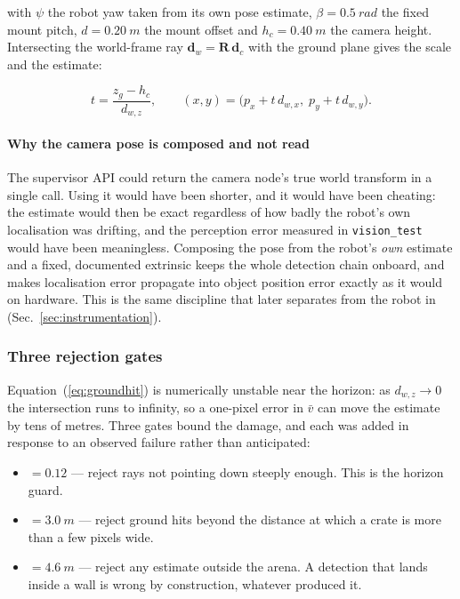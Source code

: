 with $\psi$ the robot yaw taken from its own pose estimate, $\beta =
\SI{0.5}{rad}$ the fixed mount pitch, $d = \SI{0.20}{m}$ the mount
offset and $h_c = \SI{0.40}{m}$ the camera height. Intersecting the
world-frame ray $\mathbf{d}_w = \mathbf{R}\,\mathbf{d}_c$ with the ground
plane gives the scale and the estimate:

\begin{equation}
t = \frac{z_g - h_c}{d_{w,z}},
\qquad
(x, y) = \big(p_x + t\,d_{w,x},\; p_y + t\,d_{w,y}\big).
\label{eq:groundhit}
\end{equation}

\paragraph{Why the camera pose is composed and not read}
The supervisor API could return the camera node's true world transform
in a single call. Using it would have been shorter, and it would have
been cheating: the estimate would then be exact regardless of how badly
the robot's own localisation was drifting, and the perception error
measured in \texttt{vision\_test} would have been meaningless. Composing
the pose from the robot's \emph{own} estimate and a fixed, documented
extrinsic keeps the whole detection chain onboard, and makes
localisation error propagate into object position error exactly as it
would on hardware. This is the same discipline that later separates
 from the robot in \phaseB{}
(Sec.~\ref{sec:instrumentation}).

\subsubsection{Three rejection gates}

Equation~(\ref{eq:groundhit}) is numerically unstable near the horizon:
as $d_{w,z} \to 0$ the intersection runs to infinity, so a one-pixel
error in $\bar v$ can move the estimate by tens of metres. Three gates
bound the damage, and each was added in response to an observed failure
rather than anticipated:

\begin{itemize}[leftmargin=*,itemsep=1pt,topsep=2pt]
  \item {} $= 0.12$ --- reject rays not pointing
        down steeply enough. This is the horizon guard.
  \item {} $= \SI{3.0}{m}$ --- reject ground hits beyond
        the distance at which a crate is more than a few pixels wide.
  \item {} $= \SI{4.6}{m}$ --- reject any estimate
        outside the arena. A detection that lands inside a wall is wrong
        by construction, whatever produced it.
\end{itemize}

